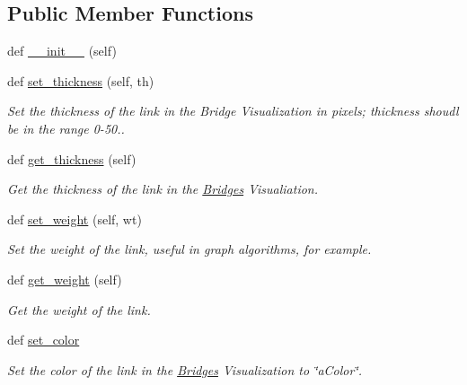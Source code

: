 \subsection*{Public Member Functions}
\begin{DoxyCompactItemize}
\item 
def \hyperlink{class_bridges_1_1_link_visualizer_1_1_link_visualizer_a4e486ba0788bee7cf153244bd41088b0}{\+\_\+\+\_\+init\+\_\+\+\_\+} (self)
\item 
def \hyperlink{class_bridges_1_1_link_visualizer_1_1_link_visualizer_a8324c9809412fb0a4994ad8bae1c7166}{set\+\_\+thickness} (self, th)
\begin{DoxyCompactList}\small\item\em Set the thickness of the link in the Bridge Visualization in pixels; thickness shoudl be in the range 0-\/50.. \end{DoxyCompactList}\item 
def \hyperlink{class_bridges_1_1_link_visualizer_1_1_link_visualizer_a40b1bda03f571e9699ea82e3b5091df2}{get\+\_\+thickness} (self)
\begin{DoxyCompactList}\small\item\em Get the thickness of the link in the \hyperlink{namespace_bridges_1_1_bridges}{Bridges} Visualiation. \end{DoxyCompactList}\item 
def \hyperlink{class_bridges_1_1_link_visualizer_1_1_link_visualizer_a289630a8863773ef59c338befb821adf}{set\+\_\+weight} (self, wt)
\begin{DoxyCompactList}\small\item\em Set the weight of the link, useful in graph algorithms, for example. \end{DoxyCompactList}\item 
def \hyperlink{class_bridges_1_1_link_visualizer_1_1_link_visualizer_af99568cc9d12689dd46a90aaa633c3be}{get\+\_\+weight} (self)
\begin{DoxyCompactList}\small\item\em Get the weight of the link. \end{DoxyCompactList}\item 
def \hyperlink{class_bridges_1_1_link_visualizer_1_1_link_visualizer_aa21d8beee358b5aae0906c6b1b6fc0eb}{set\+\_\+color}
\begin{DoxyCompactList}\small\item\em Set the color of the link in the \hyperlink{namespace_bridges_1_1_bridges}{Bridges} Visualization to \char`\"{}a\+Color\char`\"{}. \end{DoxyCompactList}\item 

\end{DoxyCompactItemize}
